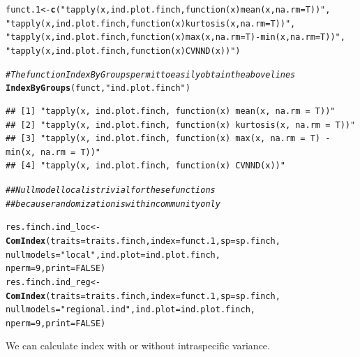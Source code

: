 \documentclass[12pt]{article}\usepackage[]{graphicx}\usepackage[]{color}
\makeatletter
\newcommand{\hlnum}[1]{\textcolor[rgb]{0.686,0.059,0.569}{#1}}%
\newcommand{\hlstr}[1]{\textcolor[rgb]{0.192,0.494,0.8}{#1}}%
\newcommand{\hlcom}[1]{\textcolor[rgb]{0.678,0.584,0.686}{\textit{#1}}}%
\newcommand{\hlstd}[1]{\textcolor[rgb]{0.345,0.345,0.345}{#1}}%
\newcommand{\hlkwb}[1]{\textcolor[rgb]{0.69,0.353,0.396}{#1}}%
\newcommand{\hlkwc}[1]{\textcolor[rgb]{0.333,0.667,0.333}{#1}}%
\newcommand{\hlkwd}[1]{\textcolor[rgb]{0.737,0.353,0.396}{\textbf{#1}}}%
\newenvironment{kframe}{%
 \def\at@end@of@kframe{}%
 \ifinner\ifhmode%
  \def\at@end@of@kframe{\end{minipage}}%
  \begin{minipage}{\columnwidth}%
 \fi\fi%
 \def\FrameCommand##1{\hskip\@totalleftmargin \hskip-\fboxsep
 \colorbox{shadecolor}{##1}\hskip-\fboxsep
     \hskip-\linewidth \hskip-\@totalleftmargin \hskip\columnwidth}%
 \MakeFramed {\advance\hsize-\width
   \@totalleftmargin\z@ \linewidth\hsize
   \@setminipage}}%
 {\par\unskip\endMakeFramed%
 \at@end@of@kframe}
\newenvironment{knitrout}{}{} %
\makeatother
\begin{document}
\begin{knitrout}
\color{fgcolor}\begin{kframe}
\begin{alltt}
\hlstd{funct.1}\hlkwb{<-}\hlkwd{c}\hlstd{(}\hlstr{"tapply(x, ind.plot.finch, function(x) mean(x, na.rm = T))"}\hlstd{,}
     \hlstr{"tapply(x, ind.plot.finch, function(x) kurtosis(x, na.rm = T))"}\hlstd{,}
     \hlstr{"tapply(x, ind.plot.finch, function(x) max(x, na.rm = T)-min(x, na.rm = T))"}\hlstd{,}
     \hlstr{"tapply(x, ind.plot.finch, function(x) CVNND(x))"} \hlstd{)}

\hlcom{#The function IndexByGroups permit to easily obtain the above lines }
\hlkwd{IndexByGroups}\hlstd{(funct,} \hlstr{"ind.plot.finch"}\hlstd{)}
\end{alltt}
\begin{verbatim}
## [1] "tapply(x, ind.plot.finch, function(x) mean(x, na.rm = T))"                   
## [2] "tapply(x, ind.plot.finch, function(x) kurtosis(x, na.rm = T))"               
## [3] "tapply(x, ind.plot.finch, function(x) max(x, na.rm = T) - min(x, na.rm = T))"
## [4] "tapply(x, ind.plot.finch, function(x) CVNND(x))"
\end{verbatim}
\begin{alltt}
\hlcom{##Null model local is trivial for these functions}
\hlcom{##because randomization is within community only}

\hlstd{res.finch.ind_loc}\hlkwb{<-}\hlkwd{ComIndex}\hlstd{(}\hlkwc{traits} \hlstd{= traits.finch,} \hlkwc{index} \hlstd{= funct.1,} \hlkwc{sp} \hlstd{= sp.finch,}
               \hlkwc{nullmodels} \hlstd{=} \hlstr{"local"}\hlstd{,} \hlkwc{ind.plot} \hlstd{= ind.plot.finch,}
               \hlkwc{nperm} \hlstd{=} \hlnum{9}\hlstd{,} \hlkwc{print} \hlstd{=} \hlnum{FALSE}\hlstd{)}
\hlstd{res.finch.ind_reg}\hlkwb{<-}\hlkwd{ComIndex}\hlstd{(}\hlkwc{traits} \hlstd{= traits.finch,} \hlkwc{index} \hlstd{= funct.1,} \hlkwc{sp} \hlstd{= sp.finch,}
               \hlkwc{nullmodels} \hlstd{=} \hlstr{"regional.ind"}\hlstd{,} \hlkwc{ind.plot} \hlstd{= ind.plot.finch,}
               \hlkwc{nperm} \hlstd{=} \hlnum{9}\hlstd{,} \hlkwc{print} \hlstd{=} \hlnum{FALSE}\hlstd{)}
\end{alltt}


{\ttfamily\noindent\bfseries\color{errorcolor}{\#\# Error: objet 's' introuvable}}\end{kframe}
\end{knitrout}


We can calculate index with or without intraspecific variance.
\end{document}

